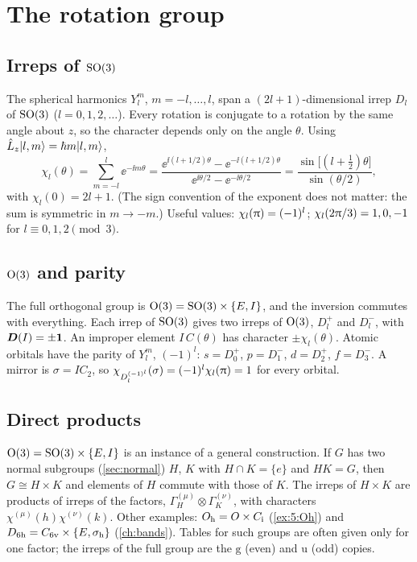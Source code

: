 \section{The rotation group}

\subsection{Irreps of \texorpdfstring{$\mathrm{SO}(3)$}{SO(3)}}
The spherical harmonics $Y_l^m$, $m=-l,\dots,l$, span a $(2l+1)$-dimensional irrep
$D_l$ of $\mathrm{SO}(3)$ ($l=0,1,2,\dots$). Every rotation is conjugate to a rotation by the
same angle about $z$, so the character depends only on the angle $\theta$. Using
$\hat{L}_z\lvert l,m\rangle=\hbar m\lvert l,m\rangle$,
\begin{equation}\label{eq:chil}
\chi_l(\theta)=\sum_{m=-l}^{l}\ee^{-\ii m\theta}
=\frac{\ee^{\ii(l+1/2)\theta}-\ee^{-\ii(l+1/2)\theta}}{\ee^{\ii\theta/2}-\ee^{-\ii\theta/2}}
=\frac{\sin\bigl[(l+\tfrac12)\theta\bigr]}{\sin(\theta/2)},
\end{equation}
with $\chi_l(0)=2l+1$. (The sign convention of the exponent does not matter: the sum
is symmetric in $m\to-m$.) Useful values: $\chi_l(\uppi)=(-1)^l$;
$\chi_l(2\uppi/3)=1,0,-1$ for $l\equiv0,1,2\pmod3$.

\subsection{\texorpdfstring{$\mathrm{O}(3)$}{O(3)} and parity}
The full orthogonal group is $\mathrm{O}(3)=\mathrm{SO}(3)\times\{E,I\}$, and the inversion commutes
with everything. Each irrep of $\mathrm{SO}(3)$ gives two irreps of $\mathrm{O}(3)$, $D_l^{+}$ and
$D_l^{-}$, with $\bm{D}(I)=\pm\bm{1}$. An improper element $I\,C(\theta)$ has character
$\pm\chi_l(\theta)$. Atomic orbitals have the parity of $Y_l^m$, $(-1)^l$:
$s=D_0^+$, $p=D_1^-$, $d=D_2^+$, $f=D_3^-$. A mirror is $\sigma=IC_2$, so
$\chi_{D_l^{(-1)^l}}(\sigma)=(-1)^l\chi_l(\uppi)=1$ for every orbital.

\subsection{Direct products\beyondmark}\label{sec:directproduct}
$\mathrm{O}(3)=\mathrm{SO}(3)\times\{E,I\}$ is an instance of a general construction. If $G$ has two
normal subgroups (\cref{sec:normal}) $H$, $K$ with $H\cap K=\{e\}$ and $HK=G$, then
$G\cong H\times K$ and elements of $H$ commute with those of $K$. The irreps of
$H\times K$ are products of irreps of the factors, $\Gamma^{(\mu)}_H\otimes
\Gamma^{(\nu)}_K$, with characters $\chi^{(\mu)}(h)\chi^{(\nu)}(k)$. Other examples:
$O_{\mathrm{h}}=O\times C_{\mathrm{i}}$ (\cref{ex:5:Oh}) and $D_{6\mathrm{h}}=C_{6\mathrm{v}}\times\{E,\sigma_{\mathrm{h}}\}$ (\cref{ch:bands}).
Tables for such groups are often given only for one factor; the irreps of the full
group are the $\mathrm{g}$ (even) and $\mathrm{u}$ (odd) copies.


